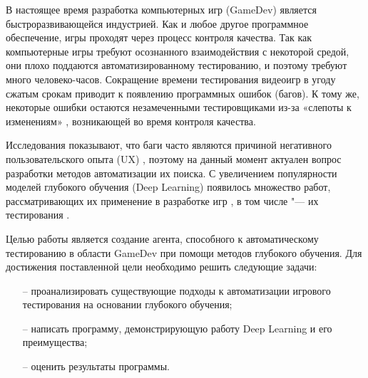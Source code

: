 \Introduction

В настоящее время разработка компьютерных игр (GameDev) является быстроразвивающейся индустрией. Как и любое другое программное обеспечение, игры проходят через процесс контроля качества. Так как  компьютерные игры требуют осознанного взаимодействия с некоторой средой, они плохо поддаются автоматизированному тестированию, и поэтому требуют много человеко-часов. Сокращение времени тестирования видеоигр в угоду сжатым срокам приводит к появлению программных ошибок (багов). К тому же, некоторые ошибки остаются незамеченными тестировщиками из-за «слепоты к изменениям» \cite{simons2005change}, возникающей во время контроля качества.

Исследования показывают, что баги часто являются причиной негативного пользовательского опыта (UX) \cite{kujala2011ux}, поэтому на данный момент актуален вопрос разработки методов автоматизации их поиска. С увеличением популярности моделей глубокого обучения (Deep Learning) появилось множество работ, рассматривающих их применение в разработке игр \cite{eldahshan2022deep}, в том числе "--- их тестирования \cite{tufano2022using,casamayor2022bug}.

Целью работы является создание агента, способного к автоматическому тестированию в области GameDev при помощи методов глубокого обучения. Для достижения поставленной цели необходимо решить следующие задачи:

\begin{itemize}
	\item[--] проанализировать существующие подходы к автоматизации игрового тестирования на основании глубокого обучения;
	\item[--] написать программу, демонстрирующую работу Deep Learning и его преимущества;
	\item[--] оценить результаты программы.
\end{itemize}

%



